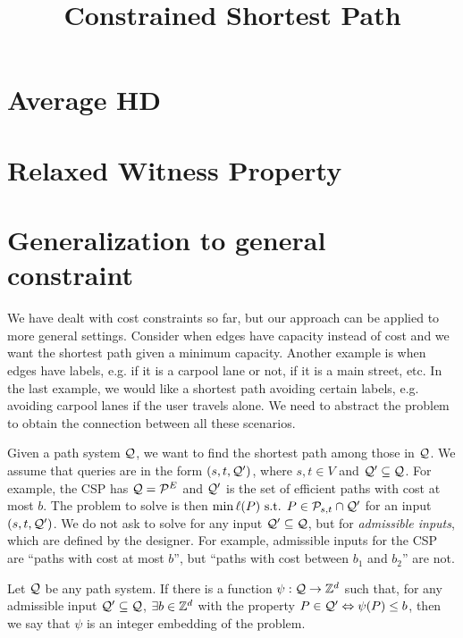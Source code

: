 \documentclass[letterpaper,11pt]{article}
\title{\vspace{-1cm} \bf Constrained Shortest Path \vspace{-1.3cm}}
\author{}
\begin{document}
\maketitle


\section{Average HD}\label{sec:avg_hd}



\section{Relaxed Witness Property}\label{sec:rel_witness}



\section{Generalization to general constraint}

We have dealt with cost constraints so far, but our approach can be applied to more general settings.
Consider when edges have capacity instead of cost and we want the shortest path given a minimum capacity.
Another example is when edges have labels, e.g. if it is a carpool lane or not, if it is a main street, etc.
In the last example, we would like a shortest path avoiding certain labels, e.g. avoiding carpool lanes if the user travels alone.
We need to abstract the problem to obtain the connection between all these scenarios.

Given a path system $\mathcal{Q}$, we want to find the shortest path among those in $\mathcal{Q}$.
We assume that queries are in the form $(s,t,\mathcal{Q}')$, where $s,t\in V$ and $\mathcal{Q}'\subseteq\mathcal{Q}$.
For example, the CSP has $\mathcal{Q}=\mathcal{P}^E$ and $\mathcal{Q}'$ is the set of efficient paths with cost at most $b$.
The problem to solve is then $\min \ell(P) \text{ s.t. } P\in\mathcal{P}_{s,t}\cap\mathcal{Q}'$ for an input $(s,t,\mathcal{Q}')$.
We do not ask to solve for any input $\mathcal{Q}'\subseteq \mathcal{Q}$, but for \emph{admissible inputs}, which are defined by the designer.
For example, admissible inputs for the CSP are ``paths with cost at most $b$'', but ``paths with cost between $b_1$ and $b_2$'' are not.  

\begin{definition}
Let $\mathcal{Q}$ be any path system.
If there is a function $\psi:\mathcal{Q}\to\mathbb{Z}^d$ such that, for any admissible input $\mathcal{Q}'\subseteq \mathcal{Q}$, $\exists b\in \mathbb{Z}^d$ with the property $P\in \mathcal{Q}'\Leftrightarrow \psi(P)\leq b$, then we say that $\psi$ is an integer embedding of the problem.
\end{definition}
\end{document}
